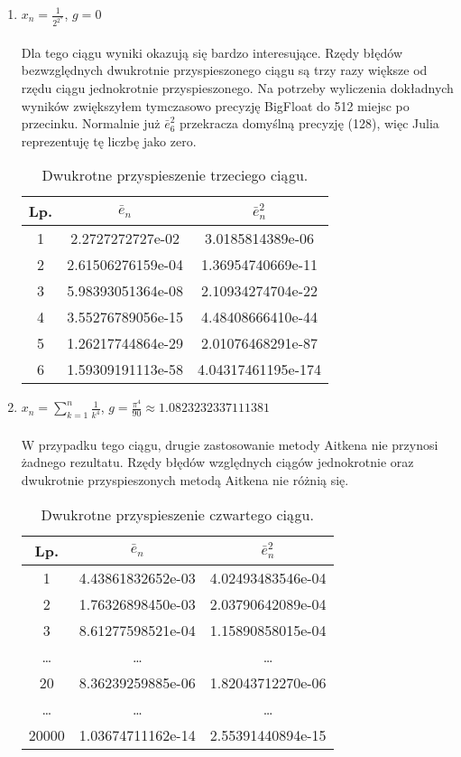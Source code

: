 \documentclass{article}
\begin{document}
\begin{enumerate}
\item $x_n = \frac{1}{2^{2^n}}$, $g = 0$ \\ \\
Dla tego ciągu wyniki okazują się bardzo interesujące. Rzędy błędów bezwzględnych dwukrotnie przyspieszonego ciągu są trzy razy większe od rzędu ciągu jednokrotnie przyspieszonego. Na potrzeby wyliczenia dokładnych wyników zwiększyłem tymczasowo precyzję BigFloat do 512 miejsc po przecinku. Normalnie już $\bar{e}_6^2$ przekracza domyślną precyzję (128), więc Julia reprezentuję tę liczbę jako zero.
\begin{table}[h]
\centering
\begin{tabular}[c]{|c|c|c|}
\hline
\textbf{Lp.} & $\bar{e}_n$ & $\bar{e}_n^2$ \\
\hline
1 & 
2.2727272727e-02  &
3.0185814389e-06 \\
\hline
2 &
2.61506276159e-04  &
1.36954740669e-11 \\
\hline
3 &
5.98393051364e-08 &
2.10934274704e-22 \\
\hline
4 &
3.55276789056e-15  &
4.48408666410e-44 \\
\hline
5 &
1.26217744864e-29 &
2.01076468291e-87\\
\hline
6 &
1.59309191113e-58 &
4.04317461195e-174 \\
\hline
\end{tabular}
\caption{Dwukrotne przyspieszenie trzeciego ciągu.}
\end{table}

\item $x_n =\sum\limits_{k=1}^n \frac{1}{k^4}$, $g = \frac{\pi^4}{90} \approx 1.0823232337111381$  \\ \\
W przypadku tego ciągu, drugie zastosowanie metody Aitkena nie przynosi żadnego rezultatu. Rzędy błędów względnych ciągów jednokrotnie oraz dwukrotnie przyspieszonych metodą Aitkena nie różnią się.
\begin{table}[h]
\centering
\begin{tabular}[c]{|c|c|c|}
\hline
\textbf{Lp.} & $\bar{e}_n$ & $\bar{e}_n^2$ \\
\hline
1 & 
4.43861832652e-03 &
4.02493483546e-04 \\
\hline
2 &
1.76326898450e-03 &
2.03790642089e-04 \\
\hline
3 &
8.61277598521e-04 &
1.15890858015e-04 \\
\hline
\dots & \ldots & \ldots \\
\hline
20 &
8.36239259885e-06 &
1.82043712270e-06 \\
\hline
\dots & \ldots & \ldots \\
\hline
20000 &
1.03674711162e-14  &
2.55391440894e-15 \\
\hline
\end{tabular}
\caption{Dwukrotne przyspieszenie czwartego ciągu.}
\end{table}


\end{enumerate}
\end{document}
